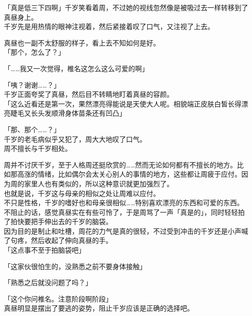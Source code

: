「真是低三下四啊」千岁笑看着周，不过她的视线忽然像是被吸过去一样转移到了真昼身上。\\

千岁先是用热情的眼神注视着，然后紧接着叹了口气，又注视了上去。

真昼也一副不太舒服的样子，看上去不知如何是好。\\

「那个，怎么了？」

「……我又一次觉得，椎名这怎么这么可爱的啊」

「咦？谢谢……？」\\

千岁正面夸奖了真昼，然后目不转睛地盯着真昼的容颜。\\

「这么近看还是第一次，果然漂亮得能说是天使大人呢。相貌端正皮肤白皙长得漂亮睫毛又长头发顺滑身体苗条还有凹凸」

「那、那个……？」\\

千岁的老毛病似乎又犯了，周大大地叹了口气。\\

周不擅长与千岁相处。

周并不讨厌千岁，至于人格周还挺欣赏的……然而无论如何都有不擅长的地方。比如那高涨的情绪，比如偶尔会太关心别人的事情的地方，这些都让周疲于应付。因为周的家里人也有类似的，所以这种意识就更加强烈了。\\

也就是说，千岁这与母亲的相似之处让周难以应付。\\

不只是性格，千岁的嗜好也和母亲很相似……特别喜欢漂亮的东西和可爱的东西。\\

不阻止的话，感觉真昼实在有些可怜了，于是周骂了一声「真是的」，同时轻轻拍了拍快要把手伸出去的千岁的脑袋。\\

因为目的是制止和吐槽，周花的力气是真的很轻，不过受到冲击的千岁还是小声喊了句疼，然后收起了伸向真昼的手。\\

「这点事不至于拍脑袋吧」

「这家伙很怕生的，没熟悉之前不要身体接触」

「熟悉之后就没问题了吗？」

「这个你问椎名。注意阶段啊阶段」\\

真昼明显是摆出了要逃的姿势，阻止千岁应该是正确的选择吧。\\

